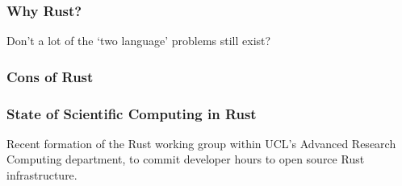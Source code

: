 \begin{frame}
    \frametitle{Why Rust?}
    Don't a lot of the `two language' problems still exist?
\end{frame}

\begin{frame}
    \frametitle{Cons of Rust}
\end{frame}


\begin{frame}
    \frametitle{State of Scientific Computing in Rust}

    Recent formation of the Rust working group within UCL's Advanced Research Computing department, to commit developer hours to open source Rust infrastructure.
\end{frame}

